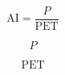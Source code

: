 \documentclass[preview,border=2pt]{standalone}
\begin{document}
\[
\mathrm{AI} = \dfrac{P}{\mathrm{PET}}
\]

\[
P
\]

\[
\mathrm{PET}
\]
\end{document}

